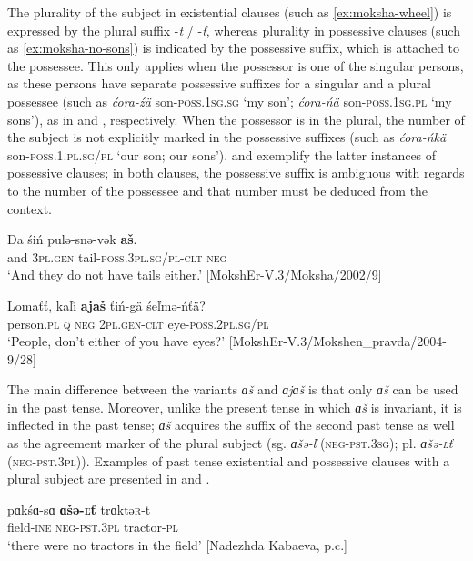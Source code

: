 \documentclass[output=paper,colorlinks,citecolor=brown,draft,draftmode]{langscibook}
\begin{document}
  The plurality of the subject in existential clauses (such as \ref{ex:moksha-wheel}) is expressed by the plural suffix -\textit{t} / -\textit{ť}, whereas plurality in possessive clauses (such as \ref{ex:moksha-no-sons}) is indicated by the possessive suffix, which is attached to the possessee. This only applies when the possessor is one of the singular persons, as these persons have separate possessive suffixes for a singular and a plural possessee (such as \textit{ćora-źä} son-\textsc{poss.1sg.sg} `my son'; \textit{ćora-ńä} son-\textsc{poss.1sg.pl} `my sons'), as in  and , respectively. When the possessor is in the plural, the number of the subject is not explicitly marked in the possessive suffixes (such as \textit{ćora-ńkä} son-\textsc{poss.1.pl.sg/pl} `our son; our sons').  and  exemplify the latter instances of possessive clauses; in both clauses, the possessive suffix is ambiguous with regards to the number of the possessee and that number must be deduced from the context. 

\ea\label{ex:moksha-tail}
\gll Da śiń pulə-snə-vək \textbf{aš}.\\
and  3\textsc{pl.gen}    tail-\textsc{poss.3pl.sg/pl-clt}  \textsc{neg}\\
\glt `And they do not have tails either.' [MokshEr-V.3/Moksha/2002/9]
\z

\ea\label{ex:moksha-eye}
\gll Lomaťť, kaľi \textbf{ajaš} ťiń-gä śeľmə-ńťä?\\
person.\textsc{pl}  \textsc{q}      \textsc{neg}  \textsc{2pl.gen-clt}  eye-\textsc{poss.2pl.sg/pl}\\
\glt `People, don't either of you have eyes?' [MokshEr-V.3/Mokshen\_pravda/2004-9/28]
\z

  The main difference between the variants \textit{ɑš} and \textit{ɑjɑš} is that only \textit{ɑš} can be used in the past tense. Moreover, unlike the present tense in which \textit{ɑš} is invariant, it is inflected in the past tense; \textit{ɑš} acquires the suffix of the second past tense as well as the agreement marker of the plural subject (sg. \textit{ɑšə-ľ} (\textsc{neg-pst.3sg}); pl. \textit{ɑšə-\textsc{ľ}ť} (\textsc{neg-pst.3pl)}). Examples of past tense existential and possessive clauses with a plural subject are presented in  and .

\ea\label{ex:moksha-tractor}
\gll pɑkśɑ-sɑ \textbf{ɑšə-\textsc{ľ}ť} trɑktə\textsc{r}-t\\
field-\textsc{ine}    \textsc{neg-pst.3pl}    tractor-\textsc{pl}\\
\glt `there were no tractors in the field' [Nadezhda Kabaeva, p.c.]
\z
\end{document}

